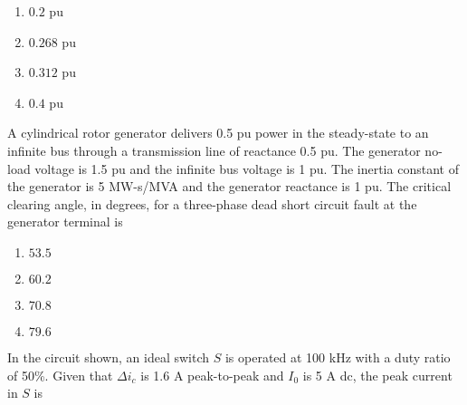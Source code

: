     \begin{multicols}{4}
        \begin{enumerate}
            \item $0.2$ pu
            \item $0.268$ pu
            \item $0.312$ pu
            \item $0.4$ pu
        \end{enumerate}
    \end{multicols}

    \item A cylindrical rotor generator delivers 0.5 pu power in the steady-state to an infinite bus through a transmission line of reactance 0.5 pu. The generator no-load voltage is 1.5 pu and the infinite bus voltage is 1 pu. The inertia constant of the generator is 5 MW-s/MVA and the generator reactance is 1 pu. The critical clearing angle, in degrees, for a three-phase dead short circuit fault at the generator terminal is

    \begin{multicols}{4}
        \begin{enumerate}
            \item $53.5$
            \item $60.2$
            \item $70.8$
            \item $79.6$
        \end{enumerate}
    \end{multicols}

    \item In the circuit shown, an ideal switch $S$ is operated at 100 kHz with a duty ratio of 50\%. Given that $\Delta i_c$ is 1.6 A peak-to-peak and $I_0$ is 5 A dc, the peak current in $S$ is

